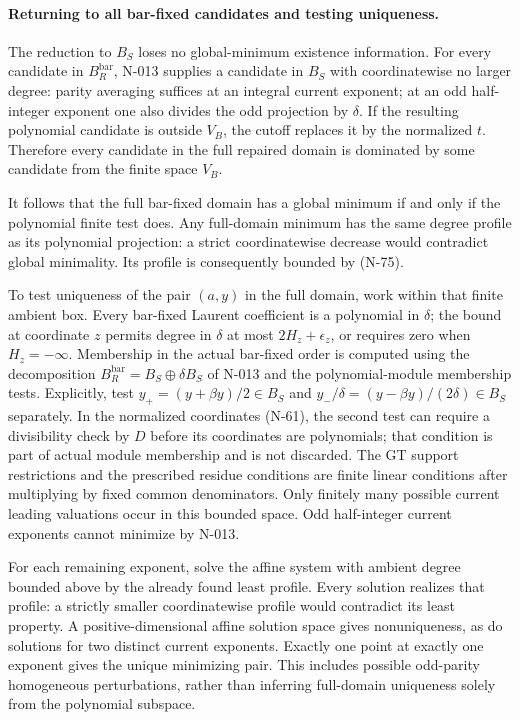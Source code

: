 \paragraph{Returning to all bar-fixed candidates and testing uniqueness.}
The reduction to $B_S$ loses no global-minimum existence
information.  For every candidate in $B_R^{\mathrm{bar}}$,
N-013 supplies a candidate in $B_S$ with coordinatewise
no larger degree: parity averaging suffices at an integral
current exponent; at an odd half-integer exponent one also
divides the odd projection by $\delta$.  If the resulting
polynomial candidate is outside $V_B$, the cutoff replaces
it by the normalized $t$.  Therefore every candidate in
the full repaired domain is dominated by some candidate
from the finite space $V_B$.

It follows that the full bar-fixed domain has a global
minimum if and only if the polynomial finite test does.
Any full-domain minimum has the same degree profile as
its polynomial projection: a strict coordinatewise
decrease would contradict global minimality.  Its profile
is consequently bounded by (N-75).

To test uniqueness of the pair $(a,y)$ in the full domain,
work within that finite ambient box.  Every bar-fixed
Laurent coefficient is a polynomial in $\delta$; the bound
at coordinate $z$ permits degree in $\delta$ at most
$2H_z+\epsilon_z$, or requires zero when $H_z=-\infty$.
Membership in the actual bar-fixed order is computed using
the decomposition $B_R^{\mathrm{bar}}=B_S\oplus\delta B_S$
of N-013 and the polynomial-module membership tests.
Explicitly, test $y_+=(y+\beta y)/2\in B_S$ and
$y_-/\delta=(y-\beta y)/(2\delta)\in B_S$ separately.
In the normalized coordinates (N-61), the second test can
require a divisibility check by $D$ before its coordinates
are polynomials; that condition is part of actual module
membership and is not discarded.
The GT support restrictions and the prescribed residue
conditions are finite linear conditions after multiplying
by fixed common denominators.  Only finitely many possible
current leading valuations occur in this bounded space.
Odd half-integer current exponents cannot minimize by N-013.

For each remaining exponent, solve the affine system with
ambient degree bounded above by the already found least
profile.  Every solution realizes that profile: a strictly
smaller coordinatewise profile would contradict its least
property.  A positive-dimensional affine solution space
gives nonuniqueness, as do solutions for two distinct
current exponents.  Exactly one point at exactly one
exponent gives the unique minimizing pair.  This includes
possible odd-parity homogeneous perturbations, rather
than inferring full-domain uniqueness solely from the
polynomial subspace.

